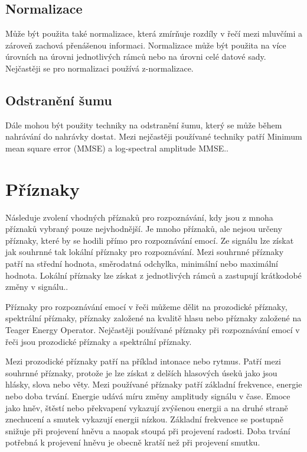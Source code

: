 \documentclass[FM,BP]{tulthesis}
\begin{document}
\subsection{Normalizace}
Může být použita také normalizace, která zmírňuje rozdíly v řečí mezi mluvčími a zároveň zachová přenášenou informaci. Normalizace může být použita na více úrovních na úrovni jednotlivých rámců nebo na úrovni celé datové sady. Nejčastěji se pro normalizaci používá z-normalizace.\cite{DBLP:journals/speech/AkcayO20}

\subsection{Odstranění šumu}
Dále mohou být použity techniky na odstranění šumu, který se může během nahrávání do nahrávky dostat. Mezi nejčastěji používané techniky patří Minimum mean square error (MMSE) a log-spectral amplitude MMSE.\cite{DBLP:journals/speech/AkcayO20}.


\section{Příznaky}
Následuje zvolení vhodných příznaků pro rozpoznávání, kdy jsou z mnoha příznaků vybraný pouze nejvhodnější. Je mnoho příznaků, ale nejsou určeny příznaky, které by se hodili přímo pro rozpoznávání emocí. Ze signálu lze získat jak souhrnné tak lokální příznaky pro rozpoznávání. Mezi souhrnné  příznaky patří na střední hodnota, směrodatná odchylka, minimální nebo maximální hodnota. Lokální příznaky lze získat z jednotlivých rámců a zastupují krátkodobé změny v signálu.\cite{DBLP:journals/speech/AkcayO20}.

Příznaky pro rozpoznávání emocí v řeči můžeme dělit na prozodické příznaky, spektrální příznaky, příznaky založené na kvalitě hlasu nebo příznaky založené na Teager Energy Operator. Nejčastěji používané příznaky při rozpoznávání emocí v řeči jsou prozodické příznaky a spektrální příznaky\cite{DBLP:journals/speech/AkcayO20}.

Mezi prozodické příznaky patří na příklad intonace nebo rytmus. Patří mezi souhrnné příznaky, protože je lze získat z delších hlasových úseků jako jsou hlásky, slova nebo věty. Mezi používané příznaky patří základní frekvence, energie nebo doba trvání. Energie udává míru změny amplitudy signálu v čase. Emoce jako hněv, štěstí nebo překvapení vykazují zvýšenou energii a na druhé straně znechucení a smutek vykazují energii nízkou. Základní frekvence se postupně snižuje při projevení hněvu a naopak stoupá při projevení radosti. Doba trvání potřebná k projevení hněvu je obecně kratší než při projevení smutku\cite{DBLP:journals/speech/AkcayO20}.
\end{document}
